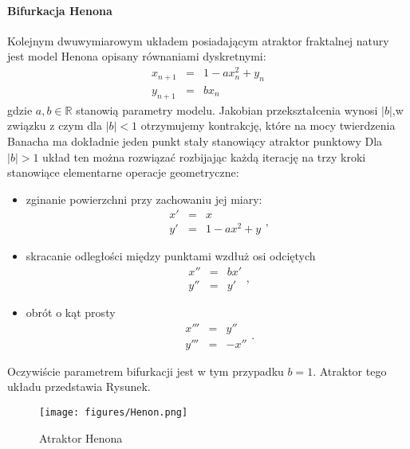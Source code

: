 \documentclass[12pt]{article}
\begin{document}
\paragraph{Bifurkacja Henona}
Kolejnym dwuwymiarowym układem posiadającym atraktor fraktalnej natury jest model Henona opisany równaniami dyskretnymi:
\begin{equation}
\begin{array}{rcl} 
x_{n+1} & = & 1-ax_{n}^2+y_{n} \\
y_{n+1} & = & bx_{n}
\end{array}
\end{equation}
gdzie $ a,b \in \mathbb{R} $ stanowią parametry modelu. Jakobian przekształcenia wynosi $ |b| $,w związku z czym dla $ |b|<1 $ otrzymujemy kontrakcję, które na mocy twierdzenia Banacha ma dokładnie jeden punkt stały stanowiący atraktor punktowy\newline
Dla $ |b|>1 $ układ ten można rozwiązać rozbijając każdą iterację na trzy kroki stanowiące elementarne operacje geometryczne:
\begin{itemize}
	\item zginanie powierzchni przy zachowaniu jej miary:
	\begin{equation}
	\begin{array}{rcl} 
	x' & = & x \\
	y' & = & 1-ax^{2}+y
	\end{array},
	\end{equation}
	\item skracanie odległości między punktami wzdłuż osi odciętych
	\begin{equation}
	\begin{array}{rcl} 
	x'' & = & bx' \\
	y'' & = & y'
	\end{array},
	\end{equation}
	\item obrót o kąt prosty
	\begin{equation}
	\begin{array}{rcl} 
	x''' & = & y'' \\
	y''' & = & -x''
	\end{array}.
	\end{equation}
\end{itemize}
Oczywiście parametrem bifurkacji jest w tym przypadku $ b=1 $. Atraktor tego układu przedstawia Rysunek.
\begin{figure}[H]
	\texttt{[image: figures/Henon.png]} 
	\centering
	\caption{Atraktor Henona}
\end{figure}
\end{document}
